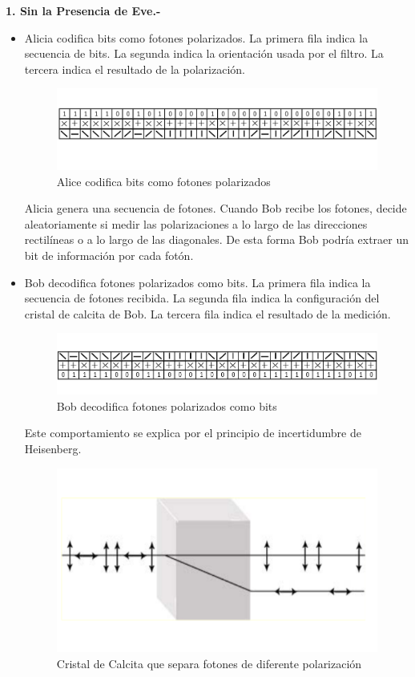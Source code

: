 \documentclass[11pt, conference]{IEEEtran}
\begin{document}
{\bf 1. Sin la Presencia de Eve.- }
\begin{itemize}
\item Alicia codifica bits como fotones polarizados. La primera fila indica la secuencia de bits. La segunda indica la orientación usada por el filtro. La tercera indica el resultado de la polarización.

\begin{figure}[hbtp]
\centering
\includegraphics[scale=0.22]{2.png} 
\caption{Alice codifica bits como fotones polarizados}
\end{figure}

Alicia genera una secuencia de fotones. Cuando Bob recibe los fotones, decide aleatoriamente si medir las polarizaciones a lo largo de las direcciones rectilíneas o a lo largo de las diagonales. De esta forma Bob podría extraer un bit de información por cada fotón.

\item Bob decodifica fotones polarizados como bits. La primera fila indica la secuencia de fotones recibida. La segunda fila indica la configuración del cristal de calcita de Bob. La tercera fila indica el resultado de la medición.

\begin{figure}[hbtp]
\centering
\includegraphics[scale=0.22]{3.png} 
\caption{Bob decodifica fotones polarizados como bits}
\end{figure}

Este comportamiento se explica por el principio de incertidumbre de Heisenberg.
\begin{figure}[hbtp]
\centering
\includegraphics[scale=0.15]{4.png} 
\caption{Cristal de Calcita que separa fotones de diferente polarización}
\end{figure}


\end{itemize}
\end{document}
